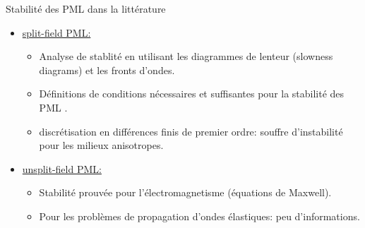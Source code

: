 \begin{frame}{Stabilité des PML dans la littérature}
\pause
    \begin{itemize}
        \item \underline{split-field PML:} 
        \begin{itemize}
        \pause
        	\item Analyse de stablité en utilisant les diagrammes de lenteur (slowness diagrams) et les fronts d'ondes.
        	\item Définitions de conditions nécessaires et suffisantes pour la stabilité des PML \cite{Becache}. 
            \item discrétisation en différences finis de premier ordre: souffre d'instabilité pour les milieux anisotropes.
        \end{itemize}
    \item \underline{unsplit-field PML:} 
        \begin{itemize}
        \pause
            \item Stabilité prouvée pour l'électromagnetisme (équations de Maxwell).
            \pause
            \item Pour les problèmes de propagation d'ondes élastiques: peu d'informations.
        \end{itemize}
    \end{itemize}
\end{frame}

